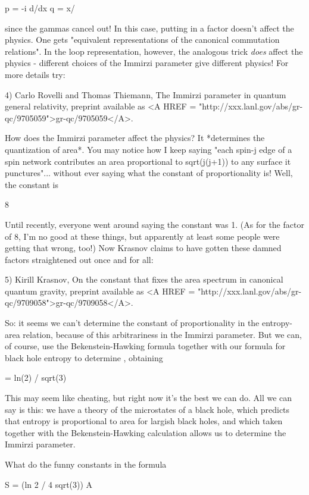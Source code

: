 p = -i \gamma  d/dx
q = x/\gamma   

since the gammas cancel out!  In this case, putting in a \gamma  factor
doesn't affect the physics.  One gets "equivalent representations of the
canonical commutation relations".  In the loop representation, however,
the analogous trick \emph{does} affect the physics - different choices of
the Immirzi parameter give different physics!  For more details try:

4) Carlo Rovelli and Thomas Thiemann, The Immirzi parameter in quantum
general relativity, preprint available as <A HREF = "http://xxx.lanl.gov/abs/gr-qc/9705059">gr-qc/9705059</A>.

How does the Immirzi parameter affect the physics?  It *determines the
quantization of area*.  You may notice how I keep saying "each spin-j
edge of a spin network contributes an area proportional to sqrt(j(j+1))
to any surface it punctures"...  without ever saying what the constant
of proportionality is!  Well, the constant is

8 \pi  \gamma  

Until recently, everyone went around saying the constant was 1.  (As for
the factor of 8\pi , I'm no good at these things, but apparently at least
some people were getting that wrong, too!)  Now Krasnov claims to have
gotten these damned factors straightened out once and for all:

5) Kirill Krasnov, On the constant that fixes the area spectrum in
canonical quantum gravity, preprint available as <A HREF = "http://xxx.lanl.gov/abs/gr-qc/9709058">gr-qc/9709058</A>.

So: it seems we can't determine the constant of proportionality in the
entropy-area relation, because of this arbitrariness in the Immirzi
parameter.  But we can, of course, use the Bekenstein-Hawking formula
together with our formula for black hole entropy to determine \gamma ,
obtaining

\gamma  = ln(2) / sqrt(3) \pi 

This may seem like cheating, but right now it's the best we can do.  All
we can say is this: we have a theory of the microstates of a black hole,
which predicts that entropy is proportional to area for largish black
holes, and which taken together with the Bekenstein-Hawking calculation
allows us to determine the Immirzi parameter.

What do the funny constants in the formula

                S = (ln 2 / 4 \pi  \gamma  sqrt(3)) A

